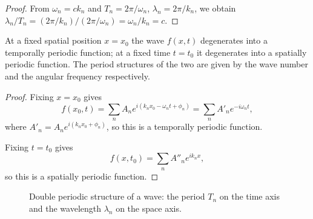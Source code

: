 \begin{proof}
From $\omega_n = c k_n$ and $T_n=2\pi/\omega_n$, $\lambda_n=2\pi/k_n$, we obtain $\lambda_n/T_n = (2\pi/k_n)/(2\pi/\omega_n)=\omega_n/k_n=c$.
\end{proof}

\begin{proposition}\label{prop:wave_periodic_function}
At a fixed spatial position $x = x_0$ the wave $f(x,t)$ degenerates into a temporally periodic function; at a fixed time $t = t_0$ it degenerates into a spatially periodic function. The period structures of the two are given by the wave number and the angular frequency respectively.
\end{proposition}

\begin{proof}
Fixing $x = x_0$ gives
\[
f(x_0, t)
= \sum_n A_n e^{i(k_n x_0 - \omega_n t + \phi_n)}
= \sum_n A'_n e^{-i\omega_n t},
\]
where $A'_n = A_n e^{i(k_n x_0 + \phi_n)}$, so this is a temporally periodic function.

Fixing $t = t_0$ gives
\[
f(x, t_0)
= \sum_n A''_n e^{ik_n x},
\]
so this is a spatially periodic function.
\end{proof}

\begin{figure}[htbp]
\centering
{}
\caption{Double periodic structure of a wave: the period $T_n$ on the time axis and the wavelength $\lambda_n$ on the space axis.}
\label{fig:wave_double_period}
\end{figure}

